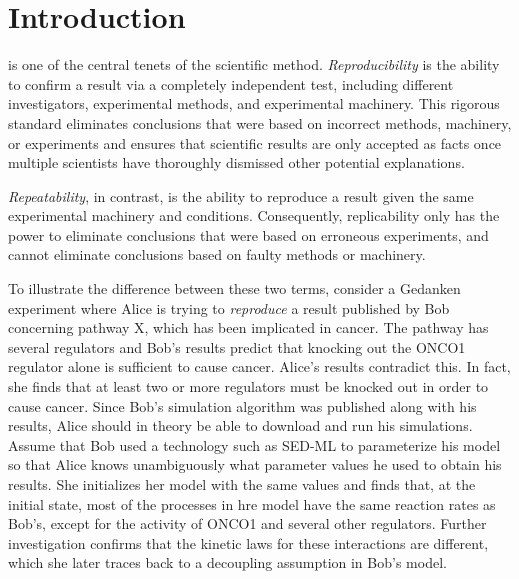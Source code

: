 \documentclass[journal,transmag,twoside]{IEEEtran}
\begin{document}
\section{Introduction}
% 
% 
% 
% 
 is one of the central tenets of the scientific method.
\textit{Reproducibility} is the ability to confirm a result via a completely independent test, including different investigators, experimental methods, and experimental machinery. 
This rigorous standard eliminates conclusions that were based on incorrect methods, machinery, or experiments and ensures that scientific results are only accepted as facts once multiple scientists have thoroughly dismissed other potential explanations. 

\textit{Repeatability}, in contrast, is the ability to reproduce a result given the same experimental machinery and conditions.
Consequently, replicability only has the power to eliminate conclusions that were based on erroneous experiments, and cannot eliminate conclusions based on faulty methods or machinery.

To illustrate the difference between these two terms, consider a Gedanken experiment where Alice is trying to \textit{reproduce} a result published by Bob concerning pathway X, which has been implicated in cancer. The pathway has several regulators and Bob's results predict that knocking out the ONCO1 regulator alone is sufficient to cause cancer. Alice's results contradict this. In fact, she finds that at least two or more regulators must be knocked out in order to cause cancer. Since Bob's simulation algorithm was published along with his results, Alice should in theory be able to download and run his simulations. Assume that Bob used a technology such as SED-ML \cite{sedml2011} to parameterize his model so that Alice knows unambiguously what parameter values he used to obtain his results. She initializes her model with the same values and finds that, at the initial state, most of the processes in hre model have the same reaction rates as Bob's, except for the activity of ONCO1 and several other regulators. Further investigation confirms that the kinetic laws for these interactions are different, which she later traces back to a decoupling assumption in Bob's model.
\end{document}
